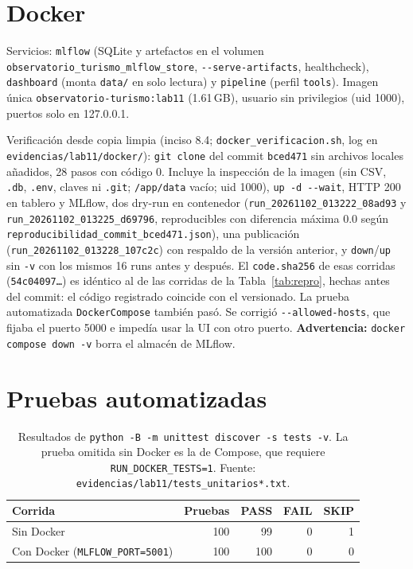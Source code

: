 \documentclass[11pt,a4paper]{article}
\newcommand{\cod}[1]{\texttt{\small #1}}
\begin{document}
\section{Docker}
Servicios: \cod{mlflow} (SQLite y artefactos en el volumen \cod{observatorio\_turismo\_mlflow\_store}, \cod{-{}-serve-artifacts}, healthcheck), \cod{dashboard} (monta \cod{data/} en solo lectura) y \cod{pipeline} (perfil \cod{tools}). Imagen única \cod{observatorio-turismo:lab11} (1.61\,GB), usuario sin privilegios (uid 1000), puertos solo en 127.0.0.1.

Verificación desde copia limpia (inciso 8.4; \cod{docker\_verificacion.sh}, log en \cod{evidencias/lab11/docker/}): \cod{git clone} del commit \cod{bced471} sin archivos locales añadidos, 28 pasos con código 0. Incluye la inspección de la imagen (sin CSV, \cod{.db}, \cod{.env}, claves ni \cod{.git}; \cod{/app/data} vacío; uid 1000), \cod{up -d -{}-wait}, HTTP 200 en tablero y MLflow, dos dry-run en contenedor (\cod{run\_20261102\_013222\_08ad93} y \cod{run\_20261102\_013225\_d69796}, reproducibles con diferencia máxima 0.0 según \cod{reproducibilidad\_commit\_bced471.json}), una publicación (\cod{run\_20261102\_013228\_107c2c}) con respaldo de la versión anterior, y \cod{down}/\cod{up} sin \cod{-v} con los mismos 16 runs antes y después. El \cod{code.sha256} de esas corridas (\cod{54c04097\ldots}) es idéntico al de las corridas de la Tabla~\ref{tab:repro}, hechas antes del commit: el código registrado coincide con el versionado. La prueba automatizada \cod{DockerCompose} también pasó. Se corrigió \cod{-{}-allowed-hosts}, que fijaba el puerto 5000 e impedía usar la UI con otro puerto. \textbf{Advertencia:} \cod{docker compose down -v} borra el almacén de MLflow.

\section{Pruebas automatizadas}
\begin{table}[H]\centering\small
\caption{Resultados de \cod{python -B -m unittest discover -s tests -v}. La prueba omitida sin Docker es la de Compose, que requiere \cod{RUN\_DOCKER\_TESTS=1}. Fuente: \cod{evidencias/lab11/tests\_unitarios*.txt}.}
\begin{tabular}{@{}lrrrr@{}}\toprule
Corrida & Pruebas & PASS & FAIL & SKIP\\\midrule
Sin Docker & 100 & 99 & 0 & 1\\
Con Docker (\cod{MLFLOW\_PORT=5001}) & 100 & 100 & 0 & 0\\
\bottomrule\end{tabular}
\end{table}
\end{document}

